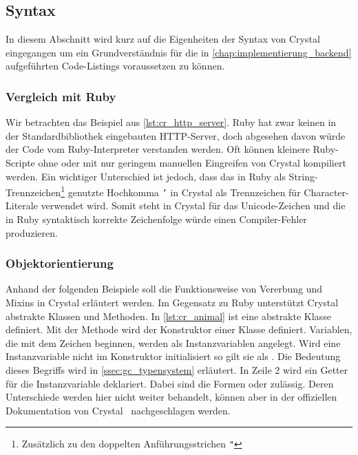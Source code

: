 \subsection{Syntax}
\label{ssec:gc_syntax}

In diesem Abschnitt wird kurz auf die Eigenheiten der Syntax von Crystal
eingegangen um ein Grundverständnis für die in
\cref{chap:implementierung_backend} aufgeführten Code-Listings voraussetzen zu
können.

\subsubsection{Vergleich mit Ruby}
\label{sssec:gcs_vergleich_zu_ruby}

Wir betrachten das Beispiel aus \cref{lst:cr_http_server}.  Ruby hat zwar keinen
in der Standardbibliothek eingebauten HTTP-Server, doch abgesehen davon würde
der Code vom Ruby-Interpreter verstanden werden.  Oft können kleinere
Ruby-Scripte ohne oder mit nur geringem manuellen Eingreifen von Crystal
kompiliert werden.  Ein wichtiger Unterschied ist jedoch, dass das in Ruby als
String-Trennzeichen\footnote{Zusätzlich zu den doppelten Anführungsstrichen
\texttt{"}} genutzte Hochkomma \texttt{'} in Crystal als Trennzeichen für
Character-Literale verwendet wird.  Somit steht  in Crystal für das
Unicode-Zeichen  und die in Ruby syntaktisch korrekte Zeichenfolge
 würde einen Compiler-Fehler produzieren.



\subsubsection{Objektorientierung}
\label{sssec:gcs_objektorientierung}

Anhand der folgenden Beispiele soll die Funktionsweise von Vererbung und Mixins
in Crystal erläutert werden.  Im Gegensatz zu Ruby unterstützt Crystal
abstrakte Klassen und Methoden.  In \cref{lst:cr_animal} ist eine abstrakte
Klasse  definiert.  Mit der Methode  wird der
Konstruktor einer Klasse definiert.  Variablen, die mit dem Zeichen 
beginnen, werden als Instanzvariablen angelegt.  Wird eine Instanzvariable
nicht im Konstruktor initialisiert so gilt sie als .  Die
Bedeutung dieses Begriffs wird in \cref{ssec:gc_typensystem} erläutert.  In
Zeile 2 wird ein Getter für die Instanzvariable  deklariert.
Dabei sind die Formen   oder 
zulässig.  Deren Unterschiede werden hier nicht weiter behandelt, können aber
in der offiziellen Dokumentation von Crystal~\cite{crystaldoc} nachgeschlagen
werden.

